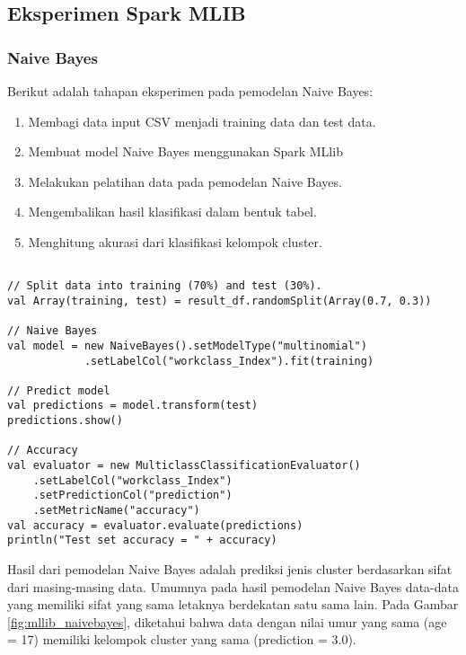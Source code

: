 \begin{enumerate}
\end{enumerate}




\subsection{Eksperimen Spark MLIB}

\subsubsection{Naive Bayes}
\noindent Berikut adalah tahapan eksperimen pada pemodelan Naive Bayes:
\begin{enumerate}
\item Membagi data input CSV menjadi training data dan test data.
\item Membuat model Naive Bayes menggunakan Spark MLlib
\item Melakukan pelatihan data pada pemodelan Naive Bayes.
\item Mengembalikan hasil klasifikasi dalam bentuk tabel.
\item Menghitung akurasi dari klasifikasi kelompok cluster.
\end{enumerate}	

\begin{lstlisting}[basicstyle=\ttfamily, frame=single,
	columns=fullflexible, keepspaces=true, breaklines=true, label=ls_kepatuhan_1_1_1_logo_sharif_judge, caption=Main method]
	
// Split data into training (70%) and test (30%).
val Array(training, test) = result_df.randomSplit(Array(0.7, 0.3))

// Naive Bayes
val model = new NaiveBayes().setModelType("multinomial")
			.setLabelCol("workclass_Index").fit(training)
			
// Predict model
val predictions = model.transform(test)
predictions.show()

// Accuracy
val evaluator = new MulticlassClassificationEvaluator()
	.setLabelCol("workclass_Index")
	.setPredictionCol("prediction")
	.setMetricName("accuracy")
val accuracy = evaluator.evaluate(predictions)
println("Test set accuracy = " + accuracy)

\end{lstlisting}
\newpage
\par Hasil dari pemodelan Naive Bayes adalah prediksi jenis cluster berdasarkan sifat dari masing-masing data. Umumnya pada hasil pemodelan Naive Bayes data-data yang memiliki sifat yang sama letaknya berdekatan satu sama lain. Pada Gambar \ref{fig:mllib_naivebayes}, diketahui bahwa data dengan nilai umur yang sama (age = 17) memiliki kelompok cluster yang sama (prediction = 3.0).

